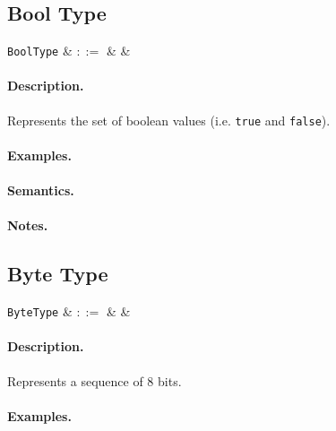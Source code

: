 
\subsection{Bool Type}

\begin{syntax}
 \verb+BoolType+ & $::=$ &  &\\
\end{syntax}

\paragraph{Description.} Represents the set of boolean values (i.e. \lstinline{true} and \lstinline{false}).

\paragraph{Examples.}

\paragraph{Semantics.}

\paragraph{Notes.} 


\subsection{Byte Type}

\begin{syntax}
 \verb+ByteType+ & $::=$ &  &\\
\end{syntax}

\paragraph{Description.}  Represents a sequence of 8 bits. 
\paragraph{Examples.}

